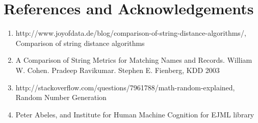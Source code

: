 \documentclass{article}
\begin{document}
\section{References and Acknowledgements}
\begin{enumerate}
\item http://www.joyofdata.de/blog/comparison-of-string-distance-algorithms/, Comparison of string distance algorithms
\item A Comparison of String Metrics for Matching Names and Records. William W. Cohen. Pradeep Ravikumar. Stephen E. Fienberg, KDD 2003
\item http://stackoverflow.com/questions/7961788/math-random-explained, Random Number Generation
\item Peter Abeles, and Institute for Human Machine Cognition for EJML library
\end{enumerate}
\end{document}

